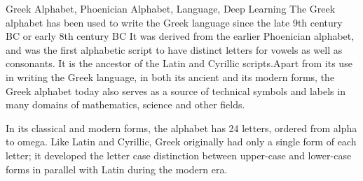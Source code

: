 \documentclass[master]{seuthesis} %
\begin{document}
\begin{abstract}{无线信道密钥生成，物理层安全，信道互易性}
\begin{itemize}
    \item 3. FDD模式下，本文使用搭建的无线密钥生成系统在相同的9种情况下连续长时间测量无线信道并生成密钥，并分析多项指标。实验结果表明，FDD模式下，合法通信双方CSI之间互易性并不完全好于和窃听者的互易性，其平均信息安全率也较差于FDD模式。FDD模式下不同情况下的CSI图像熵与TDD模式相似，但是其生成密钥在NIST随机性测试中的表现稍逊与FDD模式。在密钥生成速率方面，由于FDD模式下密钥一致率的降低，相同的降采样率下，TDD模式的密钥生成速率约为FDD模式的3倍。同时，由于相同的原因，FDD模式下的纠错码调和方案表现较差，在密钥一致率较低时，恢复的消息具有较大的误比特率。
\end{itemize}
\quad %
\end{abstract}

\begin{englishabstract}{Greek Alphabet, Phoenician Alphabet, Language, Deep Learning}
The Greek alphabet has been used to write the Greek language since the late 9th century BC or early 8th century BC It was derived from the earlier Phoenician alphabet, and was the first alphabetic script to have distinct letters for vowels as well as consonants. It is the ancestor of the Latin and Cyrillic scripts.Apart from its use in writing the Greek language, in both its ancient and its modern forms, the Greek alphabet today also serves as a source of technical symbols and labels in many domains of mathematics, science and other fields.

In its classical and modern forms, the alphabet has 24 letters, ordered from alpha to omega. Like Latin and Cyrillic, Greek originally had only a single form of each letter; it developed the letter case distinction between upper-case and lower-case forms in parallel with Latin during the modern era.
\end{englishabstract}

\tableofcontents


\end{document}

